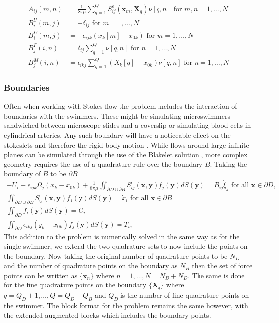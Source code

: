 \begin{align*}
A_{ij}(m,n) &= \frac{1}{8\pi\mu} \sum_{q=1}^Q S_{ij}^\epsilon (\bm{x}_m,\bm{X}_{q})\nu[q,n] \text { for } m,n = 1,\dots,N \\
B_{i}^{U}(m,j) &= -\delta_{ij} \text { for } m = 1,\dots,N \\
B_{i}^{\Omega}(m,j) &= -\epsilon_{ijk}(x_k[m]-x_{0k}) \text { for } m = 1,\dots,N \\
B_{j}^{F}(i,n) &= \delta_{ij} \sum_{q=1}^Q \nu[q,n] \text { for } n = 1,\dots,N \\
B_{j}^{M}(i,n) &= \epsilon_{ikj} \sum_{q=1}^Q (X_k[q]-x_{0 k}) \nu[q,n] \text { for } n = 1,\dots,N
\end{align*}

\subsubsection{Boundaries} \label{sec:boundries}
Often when working with Stokes flow the problem includes the interaction of boundaries with the swimmers. These might be simulating microswimmers sandwiched between microscope slides and a coverslip \cite{Gallagher2019RapidAnalysis} or simulating blood cells in cylindrical arteries. Any such boundary will have a noticeable effect on the stokeslets and therefore the rigid body motion \cite{Liron1981ExistenceBoundaries}. While flows around large infinite planes can be simulated through the use of the Blakelet solution \cite{blake_1971,Ainley2008TheStokeslets,Cortez2015}, more complex geometry requires the use of a quadrature rule over the boundary $B$. Taking the boundary of $B$ to be $\partial B$
\begin{equation}
\label{eq:swimmingProblemBnd}
\begin{gathered}
    -U_{i}-\epsilon_{i j k} \Omega_{j}\left(x_{k}-x_{0 k}\right)+\frac{1}{8 \pi\mu} \iint_{\partial D \cup \partial B} S_{i j}^{\epsilon}(\bm{x}, \bm{y}) f_{j}(\bm{y}) d S({\bm{y}})=B_{i j} \dot{\xi}_{j} \text { for all } \bm{x} \in \partial D, \\
    \iint_{\partial D \cup \partial B} S_{i j}^{\epsilon}(\bm{x}, \bm{y}) f_{j}(\bm{y}) d S({\bm{y}}) = \dot{x}_i \text { for all } \bm{x} \in \partial B \\
    \iint_{\partial D} f_{i}(\bm{y}) d S({\bm{y}})=G_i \\
    \iint_{\partial D} \epsilon_{i k j} (y_{k}-x_{0 k}) f_{j}(\bm{y}) d S({\bm{y}})=T_i,
\end{gathered}
\end{equation}
This addition to the problem is numerically solved in the same way as for the single swimmer, we extend the two quadrature sets to now include the points on the boundary. Now taking the original number of quadrature points to be $N_D$ and the number of quadrature points on the boundary as $N_B$ then the set of force points can be written as  $\{\bm{x}_n\}$ where $n=1,\dots,N=N_B+N_D$. The same is done for the fine quadrature points on the boundary $\{\bm{X}_q\}$ where $q=Q_D+1,\dots,Q=Q_D+Q_B$ and $Q_D$ is the number of fine quadrature points on the swimmer. The block format for the problem remains the same however, with the extended augmented blocks which includes the boundary points. 

